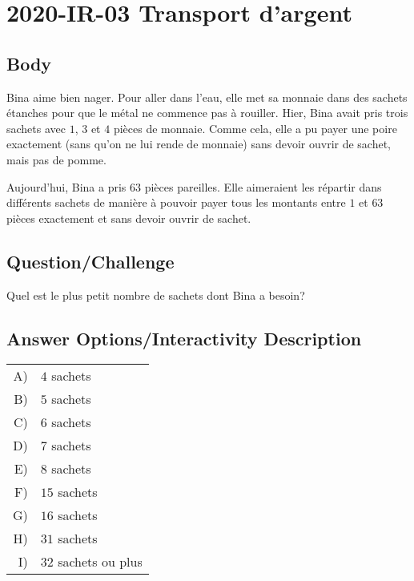 \documentclass[a4paper,11pt]{report}
\newcommand{\taskGraphicsFolder}{..}
\begin{document}
\section*{\centering{} 2020-IR-03 Transport d’argent}


\subsection*{Body}

Bina aime bien nager. Pour aller dans l’eau, elle met sa monnaie dans des sachets étanches pour que le métal ne commence pas à rouiller. Hier, Bina avait pris trois sachets avec $1$, $3$ et $4$ pièces de monnaie. Comme cela, elle a pu payer une poire exactement (sans qu’on ne lui rende de monnaie) sans devoir ouvrir de sachet, mais pas de pomme.

{\centering%
\par}

Aujourd’hui, Bina a pris $63$ pièces pareilles. Elle aimeraient les répartir dans différents sachets de manière à pouvoir payer tous les montants entre $1$ et $63$ pièces exactement et sans devoir ouvrir de sachet.

{\em

\subsection*{Question/Challenge}

Quel est le plus petit nombre de sachets dont Bina a besoin?

}\begingroup
\renewcommand{\arraystretch}{1.5}
\subsection*{Answer Options/Interactivity Description}

\begin{tabular}{ @{} r l @{} }
  A) & $4$ sachets \\ 
  B) & $5$ sachets \\ 
  C) & $6$ sachets \\ 
  D) & $7$ sachets \\ 
  E) & $8$ sachets \\ 
  F) & $15$ sachets \\ 
  G) & $16$ sachets \\ 
  H) & $31$ sachets \\ 
  I) & $32$ sachets ou plus
\end{tabular}
\end{document}
